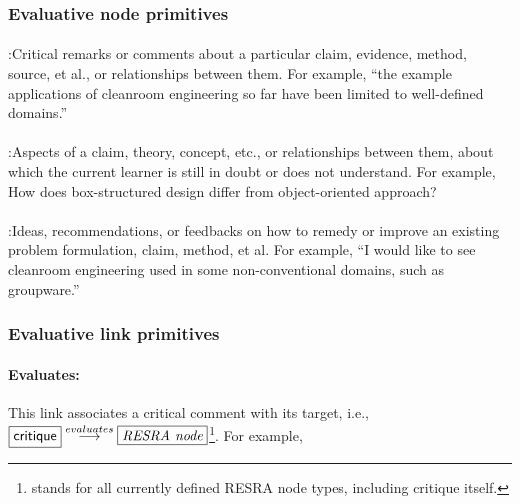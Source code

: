 \subsubsection{Evaluative node primitives}

\paragraph{}

\noindent{}:\hspace{.2in}Critical remarks or comments
about a particular claim, evidence, method, source, et al., or
relationships between them. For example, ``the example applications of
cleanroom engineering so far have been limited to well-defined domains.''

\paragraph{}

\noindent{}:\hspace{.2in}Aspects of a claim, theory,
concept, etc., or relationships between them, about which the current
learner is still in doubt or does not understand. For example, How does
box-structured design differ from object-oriented approach?
      
\paragraph{}

\noindent{}:\hspace{.2in}Ideas, recommendations, or
feedbacks on how to remedy or improve an existing problem formulation,
claim, method, et al. For example, ``I would like to see cleanroom
engineering used in some non-conventional domains, such as groupware.''


\subsubsection{Evaluative link primitives}

\paragraph{Evaluates:}

This link associates a critical comment with its target, i.e., \(
\fbox{{\sf critique}} \stackrel{evaluates}{\longrightarrow} \fbox{{\it RESRA node}}
\)\footnote{ stands for all currently defined RESRA node types,
including {\sf critique\/} itself.}. For example,

